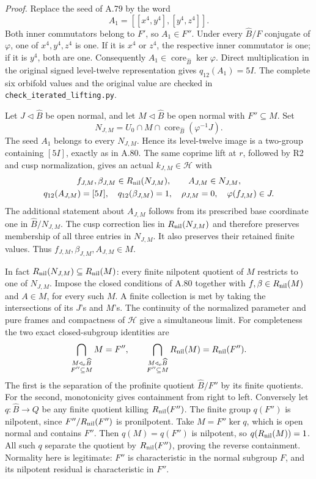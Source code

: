 \emph{Proof.}
Replace the seed of A.79 by the word
\[
                    A_1=[[x^4,y^4],[y^4,z^4]].
\]
Both inner commutators belong to $F'$, so $A_1\in F''$.
Under every $\widehat B/F$ conjugate of $\varphi$, one of
$x^4,y^4,z^4$ is one. If it is $x^4$ or $z^4$, the respective
inner commutator is one; if it is $y^4$, both are one.
Consequently $A_1\in\operatorname{core}_{\widehat B}\ker\varphi$.
Direct multiplication in the original signed level-twelve
representation gives $q_{12}(A_1)=5I$. The complete six
orbifold values and the original value are checked in
\texttt{check\_iterated\_lifting.py}.

Let $J\triangleleft\widehat B$ be open normal, and let
$M\triangleleft\widehat B$ be open normal with $F''\subseteq M$.
Set
\[
 N_{J,M}=U_0\cap M\cap
       \operatorname{core}_{\widehat B}(\varphi^{-1}J).
\]
The seed $A_1$ belongs to every $N_{J,M}$. Hence its level-twelve
image is a two-group containing $[5I]$, exactly as in A.80.
The same coprime lift at $r$, followed by R2 and cusp
normalization, gives an actual $k_{J,M}\in\mathcal H$ with
\[
 \begin{gathered}
 f_{J,M},\beta_{J,M}\in R_{\rm nil}(N_{J,M}),
 \qquad A_{J,M}\in N_{J,M},\\
 q_{12}(A_{J,M})=[5I],\quad q_{12}(\beta_{J,M})=1,
 \quad\rho_{J,M}=0,\quad\varphi(f_{J,M})\in J.
 \end{gathered}
\]
The additional statement about $A_{J,M}$ follows from its
prescribed base coordinate one in $\widehat B/N_{J,M}$.
The cusp correction lies in $R_{\rm nil}(N_{J,M})$ and
therefore preserves membership of all three entries in
$N_{J,M}$. It also preserves their retained finite values.
Thus $f_{J,M},\beta_{J,M},A_{J,M}\in M$.

In fact $R_{\rm nil}(N_{J,M})\subseteq R_{\rm nil}(M)$:
every finite nilpotent quotient of $M$ restricts to one of
$N_{J,M}$. Impose the closed conditions of A.80 together with
$f,\beta\in R_{\rm nil}(M)$ and $A\in M$, for every such $M$.
A finite collection is
met by taking the intersections of its $J$'s and $M$'s.
The continuity of the normalized parameter and pure frames
and compactness of $\mathcal H$ give a simultaneous limit.
For completeness the two exact closed-subgroup identities are
\[
 \bigcap_{\substack{M\triangleleft_o\widehat B\\F''\subseteq M}}M=F'',
 \qquad
 \bigcap_{\substack{M\triangleleft_o\widehat B\\F''\subseteq M}}
          R_{\rm nil}(M)=R_{\rm nil}(F'').
\]
The first is the separation of the profinite quotient
$\widehat B/F''$ by its finite quotients. For the second,
monotonicity gives containment from right to left. Conversely
let $q:\widehat B\to Q$ be any finite quotient killing
$R_{\rm nil}(F'')$. The finite group $q(F'')$ is nilpotent,
since $F''/R_{\rm nil}(F'')$ is pronilpotent.
Take $M=F''\ker q$, which is open normal and contains $F''$.
Then $q(M)=q(F'')$ is nilpotent, so $q(R_{\rm nil}(M))=1$.
All such $q$ separate the quotient by $R_{\rm nil}(F'')$,
proving the reverse containment. Normality here is legitimate:
$F''$ is characteristic in the normal subgroup $F$, and its
nilpotent residual is characteristic in $F''$.

